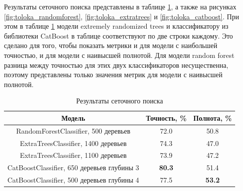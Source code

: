 Результаты сеточного поиска представлены в таблице \ref{tab:toloka_grid_search}, а также на рисунках \ref{fig:toloka_randomforest}, \ref{fig:toloka_extratrees} и \ref{fig:toloka_catboost}. При этом в таблице \ref{tab:toloka_grid_search} модели extremely randomized trees и классификатору из библиотеки CatBoost в таблице соответствуют по две строки каждому. Это сделано для того, чтобы показать метрики и для модели с наибольшей точностью, и для модели с наивысшей полнотой. Для модели random forest разница между точностью для этих двух классификаторов несущественна, поэтому представлены только значения метрик для модели с наивысшей полнотой.

\begin{table}[h]
    \centering
    \begin{tabular}{|c|c|c|}
        \hline
        Модель & Точность, \% & Полнота, \% \\
        \hline
        RandomForestClassifier, 500 деревьев & 72.0 & 50.8 \\
        \hline
        ExtraTreesClassifier, 1400 деревьев & 74.3 & 47.0 \\
        \hline
        ExtraTreesClassifier, 1100 деревьев & 73.9 & 47.2 \\
        \hline
        CatBoostClassifier, 650 деревьев глубины 3 & \textbf{80.3} & 51.4 \\
        \hline
        CatBoostClassifier, 500 деревьев глубины 4 & 77.5 & \textbf{53.2} \\
        \hline
    \end{tabular}
    \caption{Результаты сеточного поиска}
    \label{tab:toloka_grid_search}
\end{table}

